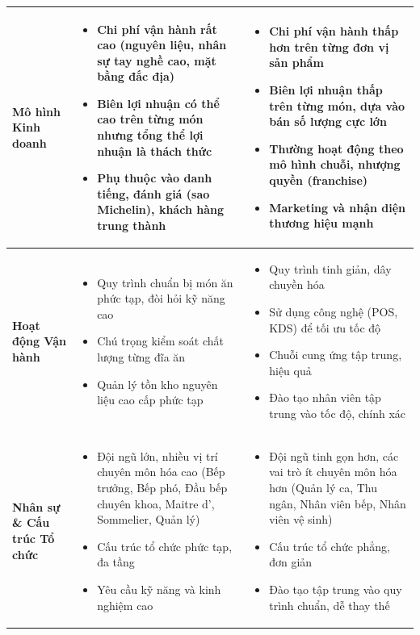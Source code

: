 \begin{longtable}{| m{3.5cm} | >{\RaggedRight}m{6.5cm} | >{\RaggedRight}m{6.5cm} |}
	\textbf{Mô hình Kinh doanh}          & \begin{itemize} \item Chi phí vận hành rất cao (nguyên liệu, nhân sự tay nghề cao, mặt bằng đắc địa) \item Biên lợi nhuận có thể cao trên từng món nhưng tổng thể lợi nhuận là thách thức \item Phụ thuộc vào danh tiếng, đánh giá (sao Michelin), khách hàng trung thành \end{itemize} & \begin{itemize} \item Chi phí vận hành thấp hơn trên từng đơn vị sản phẩm \item Biên lợi nhuận thấp trên từng món, dựa vào bán số lượng cực lớn \item Thường hoạt động theo mô hình chuỗi, nhượng quyền (franchise) \item Marketing và nhận diện thương hiệu mạnh \end{itemize} \\
	\hline
	\textbf{Hoạt động Vận hành}          & \begin{itemize} \item Quy trình chuẩn bị món ăn phức tạp, đòi hỏi kỹ năng cao \item Chú trọng kiểm soát chất lượng từng đĩa ăn \item Quản lý tồn kho nguyên liệu cao cấp phức tạp \end{itemize}                                                                                         & \begin{itemize} \item Quy trình tinh giản, dây chuyền hóa \item Sử dụng công nghệ (POS, KDS) để tối ưu tốc độ \item Chuỗi cung ứng tập trung, hiệu quả \item Đào tạo nhân viên tập trung vào tốc độ, chính xác \end{itemize}                                                    \\
	\hline
	\textbf{Nhân sự \& Cấu trúc Tổ chức} & \begin{itemize} \item Đội ngũ lớn, nhiều vị trí chuyên môn hóa cao (Bếp trưởng, Bếp phó, Đầu bếp chuyên khoa, Maitre d', Sommelier, Quản lý) \item Cấu trúc tổ chức phức tạp, đa tầng \item Yêu cầu kỹ năng và kinh nghiệm cao \end{itemize}                                            & \begin{itemize} \item Đội ngũ tinh gọn hơn, các vai trò ít chuyên môn hóa hơn (Quản lý ca, Thu ngân, Nhân viên bếp, Nhân viên vệ sinh) \item Cấu trúc tổ chức phẳng, đơn giản \item Đào tạo tập trung vào quy trình chuẩn, dễ thay thế \end{itemize}                            \\

\end{longtable}
